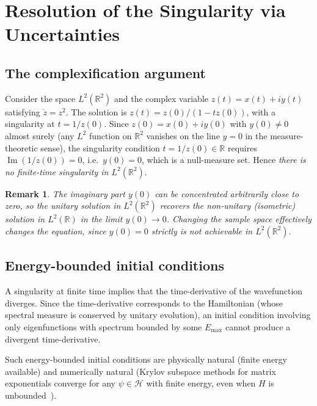 \documentclass[11pt,a4paper]{article}
\newtheorem{remark}{Remark}
\newcommand{\Rset}{\mathbb{R}}
\newcommand{\Hil}{\mathcal{H}}
\begin{document}
\section{Resolution of the Singularity via
Uncertainties}\label{sec:resolution}

\subsection{The complexification argument}

Consider the space $L^{2}(\Rset^{2})$ and the complex variable
$z(t)=x(t)+iy(t)$ satisfying $\dot{z}=z^{2}$.  The solution is
$z(t)=z(0)/(1-tz(0))$, with a singularity at $t=1/z(0)$.  Since
$z(0)=x(0)+iy(0)$ with $y(0)\neq 0$ almost surely (any $L^{2}$ function
on $\Rset^{2}$ vanishes on the line $y=0$ in the measure-theoretic
sense), the singularity condition $t=1/z(0)\in\Rset$ requires
$\operatorname{Im}(1/z(0))=0$, i.e.\ $y(0)=0$, which is a null-measure
set.  Hence \emph{there is no finite-time singularity in
$L^{2}(\Rset^{2})$}.

\begin{remark}
The imaginary part $y(0)$ can be concentrated arbitrarily close to zero,
so the unitary solution in $L^{2}(\Rset^{2})$ recovers the non-unitary
(isometric) solution in $L^{2}(\Rset)$ in the limit $y(0)\to 0$.
Changing the sample space effectively changes the equation, since
$y(0)=0$ strictly is not achievable in $L^{2}(\Rset^{2})$.
\end{remark}

\subsection{Energy-bounded initial conditions}

A singularity at finite time implies that the time-derivative of the
wavefunction diverges.  Since the time-derivative corresponds to the
Hamiltonian (whose spectral measure is conserved by unitary evolution),
an initial condition involving only eigenfunctions with spectrum bounded
by some $E_{\max}$ cannot produce a divergent time-derivative.

Such energy-bounded initial conditions are physically natural (finite
energy available) and numerically natural (Krylov subspace methods for
matrix exponentials converge for any $\psi\in\Hil$ with finite energy,
even when $H$ is unbounded~\cite{hashimoto_shift-invert_2019,hashimoto_shift-invert_2016}).
\end{document}
